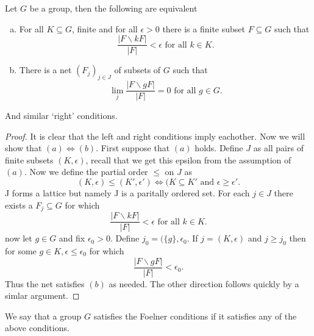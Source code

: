 \begin{propn}
  Let $G$ be a group, then the following are equivalent
  \begin{enumerate}[(a)]
    \item For all $K \subseteq G$, finite and for all $\epsilon > 0$ there is
      a finite subset $F \subseteq G$ such that
      \[
      \frac{|F \backslash kF|}{|F|} < \epsilon \textrm{ for all $k \in K$}
      .\] 
    \item There is a net $(F_j)_{j \in J}$ of subsets of $G$ such that
      \[
      \lim_{j} \frac{|F \backslash gF|}{|F|} = 0 \textrm{ for all $g \in G$}
      .\] 
  \end{enumerate}
  And similar `right' conditions.
\end{propn}
\begin{proof}
  It is clear that the left and right conditions imply eachother. Now we will
  show that $(a) \iff (b)$. First suppose that $(a)$ holds. Define $J$ as all
  pairs of finite subsets $(K, \epsilon)$, recall that we get this epsilon from
  the assumption of $(a)$. Now we define the partial order $\le$ on $J$ as
  \[
    (K, \epsilon) \le (K', \epsilon') \iff (K \subseteq K' \textrm{ and
    } \epsilon \ge \epsilon'
  .\] 
  J forms a lattice but namely J is a paritally ordered set. For each $j \in J$
  there exists a $F_j \subseteq G$ for which
  \[
      \frac{|F \backslash kF|}{|F|} < \epsilon \textrm{ for all $k \in K$}
  .\] 
  now let $g \in G$ and fix $\epsilon_0 > 0$. Define $j_0 = (\{g\}
  , \epsilon_0$. If $j = (K , \epsilon)$ and $j \ge j_0$ then for some $g \in
  K, \epsilon \le \epsilon_0$ for which
  \[
      \frac{|F \backslash gF|}{|F|} < \epsilon_0 
  .\] 
  Thus the net satisfies $(b)$ as needed. The other direction follows quickly
  by a simlar argument.
\end{proof}

\begin{defn}
  We say that a group $G$ satisfies the Foelner conditions if it satisfies any
  of the above conditions.
\end{defn}










